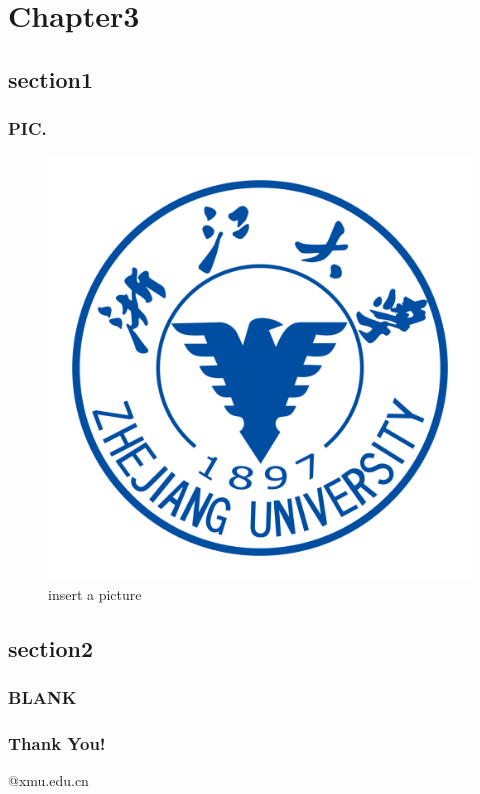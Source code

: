 \documentclass[xcolor=svgnames]{beamer}
\begin{document}
\section{Chapter3}
\subsection{section1}
\begin{frame}[fragile]
  \frametitle{PIC.}
  \begin{figure}
 \centering
 \includegraphics[width=0.5\linewidth]{ZJU_LOGO.png}
 \caption{insert a picture}
\end{figure}
\end{frame}


\subsection{section2}
\begin{frame}[fragile]
  \frametitle{BLANK}
\end{frame}


\begin{frame}
  \frametitle{Thank You!}

  \begin{center}
    \*\*\*@xmu.edu.cn
  \end{center}
  \nocite{*}
  
\end{frame}

\end{document}
